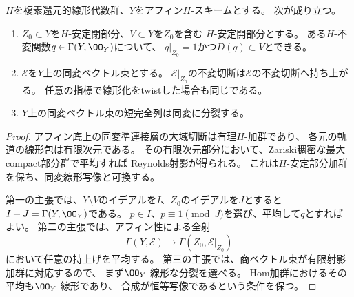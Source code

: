 \begin{lemma}[アフィン底上の同変持上げ]
\label{lem:pg-equivariant-affine-lifting}
$H$を複素還元的線形代数群、$Y$をアフィン$H$-スキームとする。
次が成り立つ。
\begin{enumerate}
\item $Z_0\subset Y$を$H$-安定閉部分、$V\subset Y$を$Z_0$を含む
$H$-安定開部分とする。
ある$H$-不変関数$q\in\Gamma(Y,\OO_Y)$について、
$q|_{Z_0}=1$かつ$D(q)\subset V$とできる。
\item $\mathcal E$を$Y$上の同変ベクトル束とする。
$\mathcal E|_{Z_0}$の不変切断は$\mathcal E$の不変切断へ持ち上がる。
任意の指標で線形化をtwistした場合も同じである。
\item $Y$上の同変ベクトル束の短完全列は同変に分裂する。
\end{enumerate}
\end{lemma}
\begin{proof}
アフィン底上の同変準連接層の大域切断は有理$H$-加群であり、
各元の軌道の線形包は有限次元である。
その有限次元部分において、Zariski稠密な最大compact部分群で平均すれば
Reynolds射影が得られる。
これは$H$-安定部分加群を保ち、同変線形写像と可換する。

第一の主張では、$Y\setminus V$のイデアルを$I$、$Z_0$のイデアルを$J$とすると
$I+J=\Gamma(Y,\OO_Y)$である。
$p\in I$、$p\equiv1\pmod J$を選び、平均して$q$とすればよい。
第二の主張では、アフィン性による全射
\begin{equation}
 \Gamma(Y,\mathcal E)\longrightarrow
 \Gamma(Z_0,\mathcal E|_{Z_0})
 \label{eq:pg-equivariant-restriction-surjection}
\end{equation}
において任意の持上げを平均する。
第三の主張では、商ベクトル束が有限射影加群に対応するので、
まず$\OO_Y$-線形な分裂を選べる。
Hom加群におけるその平均も$\OO_Y$-線形であり、
合成が恒等写像であるという条件を保つ。
\end{proof}

